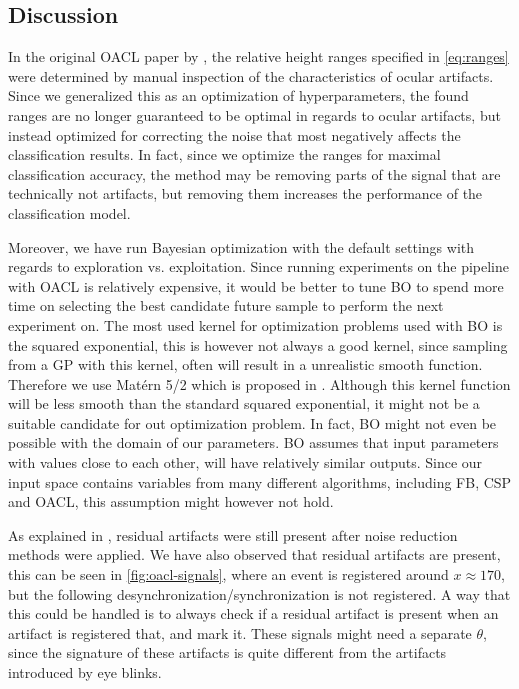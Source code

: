 \subsection{Discussion}\label{sec:discussion}
In the original OACL paper by \citep{li2015ocular}, the relative height ranges specified in \cref{eq:ranges} were determined by manual inspection of the characteristics of ocular artifacts. Since we generalized this as an optimization of hyperparameters, the found ranges are no longer guaranteed to be optimal in regards to ocular artifacts, but instead optimized for correcting the noise that most negatively affects the classification results. In fact, since we optimize the ranges for maximal classification accuracy, the method may be removing parts of the signal that are technically not artifacts, but removing them increases the performance of the classification model.

Moreover, we have run Bayesian optimization with the default settings with regards to exploration vs. exploitation. Since running experiments on the pipeline with OACL is relatively expensive, it would be better to tune BO to spend more time on selecting the best candidate future sample to perform the next experiment on. The most used kernel for optimization problems used with BO is the squared exponential, this is however not always a good kernel, since sampling from a GP with this kernel, often will result in a unrealistic smooth function. Therefore we use Matérn 5/2 which is proposed in \citep{snoek2012practical}. Although this kernel function will be less smooth than the standard squared exponential, it might not be a suitable candidate for out optimization problem. In fact, BO might not even be possible with the domain of our parameters. BO assumes that input parameters with values close to each other, will have relatively similar outputs. Since our input space contains variables from many different algorithms, including FB, CSP and OACL, this assumption might however not hold. 

As explained in \cite{hoffmann2008correction}, residual artifacts were still present after noise reduction methods were applied. We have also observed that residual artifacts are present, this can be seen in \cref{fig:oacl-signals}, where an event is registered around $x \approx 170$, but the following desynchronization/synchronization is not registered. A way that this could be handled is to always check if a residual artifact is present when an artifact is registered that, and mark it. These signals might need a separate $\theta$, since the signature of these artifacts is quite different from the artifacts introduced by eye blinks.

